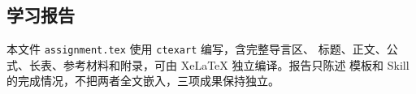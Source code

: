 \subsection{学习报告}

本文件 \texttt{assignment.tex} 使用 \texttt{ctexart} 编写，含完整导言区、
标题、正文、公式、长表、参考材料和附录，可由 XeLaTeX 独立编译。报告只陈述
模板和 Skill 的完成情况，不把两者全文嵌入，三项成果保持独立。

